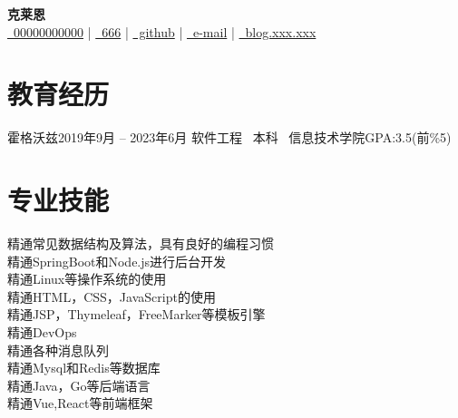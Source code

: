 \documentclass[a4paper]{article}
\begin{document}
\pagestyle{empty}
\setlength{\parindent}{0pt}

{\fontsize{9pt}{7pt}\selectfont


\begin{center}
    \textbf{\Huge 克莱恩} \\ 
    \vspace{5pt} %
    \hspace{10pt}
    \href{tel:+8600000000000}{\faPhoneVolume \ 00000000000} | 
    \href{weixin:666}{\faWeixin \ 666} | 
    \href{https://github.com}{\faGithub \ github}  | 
    \href{mailto:email}{\faEnvelope \ e-mail} | 
    \href{https://blog.xxx.xxx/}{\faRss \ blog.xxx.xxx}
    \vspace{-5pt}
\end{center}


\ignorespaces
\section{\textbf{教育经历}}
    \resumeTable
    {霍格沃兹}{2019年9月 -- 2023年6月}
    {软件工程 \ 本科 \ 信息技术学院}{GPA:3.5(前\%5)}


\section{\textbf{专业技能}}

    \textbullet 精通常见数据结构及算法，具有良好的编程习惯 \\
    \textbullet 精通SpringBoot和Node.js进行后台开发 \\
    \textbullet 精通Linux等操作系统的使用 \\
    \textbullet 精通HTML，CSS，JavaScript的使用 \\
    \textbullet 精通JSP，Thymeleaf，FreeMarker等模板引擎 \\
    \textbullet 精通DevOps \\
    \textbullet 精通各种消息队列 \\
    \textbullet 精通Mysql和Redis等数据库 \\
    \textbullet 精通Java，Go等后端语言 \\
    \textbullet 精通Vue,React等前端框架 \\

}
\end{document}
